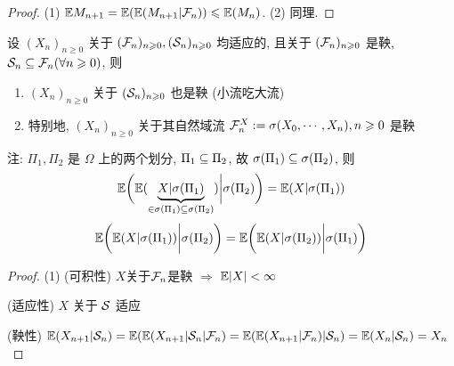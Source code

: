 \begin{proof}
    (1) $\mathbb E M_{n+1}=\mathbb E(\mathbb E(M_{n+1}|\mathcal{F}_n))\leqslant \mathbb E(M_n)$. (2) 同理.
\end{proof}

\begin{theorem}
    设 $(X_n)_{n\geq 0}$ 关于 $(\mathcal{F}_n)_{n\geqslant 0}, (\mathcal{S}_n)_{n\geqslant 0}$ 均适应的, 且关于 $(\mathcal{F}_n)_{n\geqslant 0}$ 是鞅, $\mathcal{S}_n\subseteq \mathcal{F}_n (\forall n\geqslant 0)$, 则
    \begin{enumerate}
        \item $(X_n)_{n\geq 0}$ 关于 $(\mathcal{S}_n)_{n\geqslant 0}$ 也是鞅 (小流吃大流)
        \item 特别地, $(X_n)_{n\geq 0}$ 关于其自然域流 $\mathcal{F}_n^X:=\sigma(X_0,\cdots,X_n), n\geqslant 0$ 是鞅 
    \end{enumerate}
\end{theorem}

注: $\Pi_1,\Pi_2$ 是 $\Omega$ 上的两个划分, $\Pi_1\subseteq \Pi_2$, 故 $\sigma(\Pi_1)\subseteq \sigma(\Pi_2)$, 则
\[
\mathbb E\bigg(
    \mathbb E(
        \underbrace{X|\sigma(\Pi_1)}_{\in \sigma(\Pi_1)\subseteq \sigma(\Pi_2)}
    )\bigg| \sigma(\Pi_2)
\bigg)=\mathbb E(X|\sigma(\Pi_1))
\]
\[
\mathbb E\bigg(
    \mathbb E(
        X|\sigma(\Pi_1)
    )\bigg| \sigma(\Pi_2)
\bigg)=
\mathbb E\bigg(
    \mathbb E(
        X|\sigma(\Pi_2)
    )\bigg| \sigma(\Pi_1)
\bigg)
\]
\begin{proof}
    (1) (可积性) $X$关于$\mathcal{F}_n$是鞅 $\Rightarrow$ $\mathbb E|X|<\infty$

    (适应性) $X$ 关于 $\mathcal{S}$ 适应

    (鞅性) $\mathbb E(X_{n+1}|\mathcal{S}_n)=\mathbb E(\mathbb E(X_{n+1}|\mathcal{S}_n|\mathcal{F}_n)=\mathbb E(\mathbb E(X_{n+1}|\mathcal{F}_n)|\mathcal{S}_n)=\mathbb E(X_n|\mathcal{S}_n)=X_n$
\end{proof}